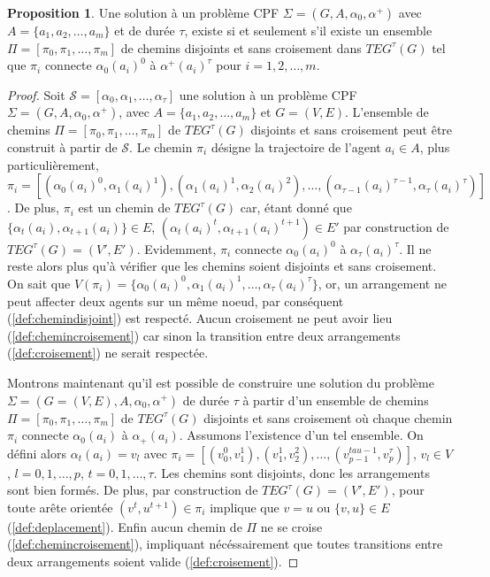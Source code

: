 \documentclass[french, 12pt, letterpaper]{article}
\theoremstyle{definition}
\theoremstyle{proposition}
\newtheorem{proposition}[definition]{Proposition}
\theoremstyle{example}
\begin{document}
    \begin{proposition}
        Une solution à un problème CPF $\Sigma = ( G, A, \alpha_0, \alpha^+ )$ avec $A = \{a_1, a_2, \ldots, a_m\}$ et de durée $\tau$,
        existe si et seulement s'il existe un ensemble $\Pi = [\pi_0, \pi_1, \ldots, \pi_m]$ de chemins disjoints et sans croisement dans $TEG^\tau(G)$
        tel que $\pi_i$ connecte $\alpha_0(a_i)^0$ à $\alpha^+(a_i)^\tau$ pour $i = 1, 2, \ldots, m$.
    \end{proposition}

    \begin{proof}
        Soit $\mathcal{S} = [\alpha_0, \alpha_1, \ldots, \alpha_\tau]$ une solution à un problème CPF $\Sigma = ( G, A, \alpha_0, \alpha^+ )$, avec
        $A = \{a_1, a_2, \ldots, a_m\}$ et $G = ( V, E )$.
        L'ensemble de chemins $\Pi = [\pi_0, \pi_1, \ldots, \pi_m]$ de $TEG^\tau(G)$ disjoints et sans croisement peut être construit à partir de $\mathcal{S}$.
        Le chemin $\pi_i$ désigne la trajectoire de l'agent $a_i \in A$, plus particulièrement, 
        $\pi_i = [( \alpha_0(a_i)^0, \alpha_1(a_i)^1 ), ( \alpha_1(a_i)^1, \alpha_2(a_i)^2 ),
        \ldots, ( \alpha_{\tau-1}(a_i)^{\tau-1}, \alpha_\tau(a_i)^\tau )]$.
        De plus, $\pi_i$ est un chemin de $TEG^\tau(G)$ car, étant donné que $\{\alpha_t(a_i), \alpha_{t+1}(a_i)\} \in E$, 
        $( \alpha_t(a_i)^t, \alpha_{t+1}(a_i)^{t+1} ) \in E'$ 
        par construction de $TEG^\tau(G) = ( V', E' )$. 
        Evidemment, $\pi_i$ connecte $\alpha_0(a_i)^0$ à $\alpha_\tau(a_i)^\tau$.
        Il ne reste alors plus qu'à vérifier que les chemins soient disjoints et sans croisement.
        On sait que $V(\pi_i) = \{\alpha_0(a_i)^0, \alpha_1(a_i)^1, \ldots, \alpha_\tau(a_i)^\tau\}$, or, un arrangement ne peut affecter deux agents
        sur un même noeud, par conséquent (\ref{def:chemindisjoint}) est respecté.
        Aucun croisement ne peut avoir lieu (\ref{def:chemincroisement}) car sinon la transition entre deux arrangements (\ref{def:croisement}) ne serait respectée.

        Montrons maintenant qu'il est possible de construire une solution du problème $\Sigma = ( G = ( V, E ), A, \alpha_0, \alpha^+ )$ de durée $\tau$ 
        à partir d'un ensemble de chemins $\Pi = [\pi_0, \pi_1, \ldots, \pi_m]$ de $TEG^\tau(G)$ disjoints et sans croisement 
        où chaque chemin $\pi_i$ connecte $\alpha_0(a_i)$ à $\alpha_+(a_i)$. 
        Assumons l'existence d'un tel ensemble. 
        On défini alors $\alpha_t(a_i) = v_l$ avec $\pi_i = [( v_0^0, v_1^1 ), ( v_1^1, v_2^2 ), \ldots, 
        ( v_{p-1}^{tau-1}, v_p^\tau )]$, $v_l \in V$, $l = 0, 1, \ldots, p$, $t = 0, 1, \ldots, \tau$.
        Les chemins sont disjoints, donc les arrangements sont bien formés. 
        De plus, par construction de $TEG^\tau(G) = ( V', E' )$, pour toute arête orientée $( v^t, u^{t+1} ) \in \pi_i$ 
        implique que $v = u$ ou $\{v, u\} \in E$ (\ref{def:deplacement}). 
        Enfin aucun chemin de $\Pi$ ne se croise (\ref{def:chemincroisement}), impliquant nécéssairement que toutes transitions entre deux arrangements
        soient valide (\ref{def:croisement}).


    \end{proof}
\end{document}
